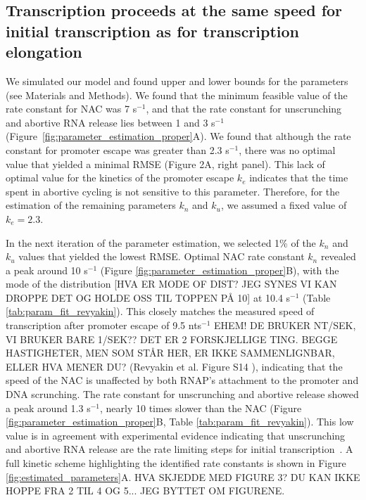 %
\subsection{Transcription proceeds at the same speed for initial transcription
as for transcription elongation}

We simulated our model and found upper and lower bounds for the parameters
(see Materials and Methods). We found that the minimum feasible value of the rate constant for NAC was 7 s$^{-1}$, and that the rate constant for unscrunching and abortive RNA
release lies between 1 and 3 s$^{-1}$
(Figure~\ref{fig:parameter_estimation_proper}A). We found that although the
rate constant for promoter escape was greater than 2.3 s$^{-1}$, there was no optimal value that yielded a minimal RMSE (Figure 2A, right panel). This lack of optimal value for the kinetics of the promoter
escape $k_e$  indicates that the time spent in abortive cycling is not sensitive to this parameter. Therefore, for the estimation of the remaining parameters $k_n$ and $k_u$, we assumed a fixed value of $k_e=2.3$.  

In the next iteration of the parameter estimation, we selected 1\% of the $k_n$ and $k_u$ values that yielded the  lowest RMSE. Optimal NAC rate constant $k_n$ revealed a peak around 10 s$^{-1}$ (Figure
\ref{fig:parameter_estimation_proper}B), with the mode of the distribution [HVA ER MODE OF DIST? JEG SYNES VI KAN DROPPE DET OG HOLDE OSS TIL TOPPEN PÅ 10] at
10.4 s$^{-1}$ (Table \ref{tab:param_fit_revyakin}). This closely matches the
measured speed of transcription after promoter escape of 9.5 nts$^{-1}$ EHEM! DE BRUKER NT/SEK, VI BRUKER BARE 1/SEK?? DET ER 2 FORSKJELLIGE TING. BEGGE HASTIGHETER, MEN SOM STÅR HER, ER IKKE SAMMENLIGNBAR, ELLER HVA MENER DU? 
(Revyakin et al. Figure S14 \cite{revyakin_abortive_2006}), indicating that
the speed of the NAC is unaffected by both RNAP's attachment to the promoter
and DNA scrunching. The rate constant for unscrunching and abortive release
showed a peak around 1.3 s$^{-1}$, nearly 10 times slower than the NAC (Figure
\ref{fig:parameter_estimation_proper}B, Table \ref{tab:param_fit_revyakin}).
This low value is in agreement with experimental evidence indicating that
unscrunching and abortive RNA release are the rate limiting steps for initial
transcription~\cite{revyakin_abortive_2006, margeat_direct_2006}. A full
kinetic scheme highlighting the identified rate constants is shown in Figure 
\ref{fig:estimated_parameters}A. HVA SKJEDDE MED FIGURE 3? DU KAN IKKE HOPPE FRA 2 TIL 4 OG 5...  JEG BYTTET OM FIGURENE.


